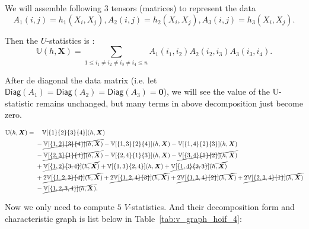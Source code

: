 \documentclass[letterpaper,11pt]{article}
\newcommand{\diag}{\mathsf{Diag}}
\newcommand{\diagp}[1]{\diag(#1)}
\newcommand{\ustat}{\mathbb{U}}
\newcommand{\vstat}{\mathbb{V}}
\begin{document}
We will assemble following 3 tensors (matrices) to represent the data
\begin{equation*}
    A_1(i,j) = h_1(X_i,X_j), A_2(i,j) = h_2(X_i,X_j), A_3(i,j) = h_3(X_i,X_j).
\end{equation*}

Then the $U$-statistics is :
\begin{equation*}
    \ustat(h, \bm{X}) = \sum_{1 \le i_1 \neq i_2 \neq i_3 \neq i_4 \leq n}  A_1(i_1,i_2)A_2(i_2,i_3)A_3(i_3,i_4).
\end{equation*}

After de diagonal the data matrix (i.e. let $\diagp{A_1} =  \diagp{A_2} = \diagp{A_3} = \bm{0}$), we will see the value of the U-statistic remains unchanged, but many terms in above decomposition just become zero. 

\begin{align*}
\ustat(h, \bm{X}) =\; & 
\hspace{1em}
\vstat[\{1\}\{2\}\{3\}\{4\}](h, \bm{X}) \\
& 
- \cancel{\vstat[\{1,2\}\{3\}\{4\}](h, \bm{X})}
- \vstat[\{1,3\}\{2\}\{4\}](h, \bm{X})
- \vstat[\{1,4\}\{2\}\{3\}](h, \bm{X}) \\
& 
- \cancel{\vstat[\{2,3\}\{1\}\{4\}](h, \bm{X})}
- \vstat[\{2,4\}\{1\}\{3\}](h, \bm{X})
- \cancel{\vstat[\{3,4\}\{1\}\{2\}](h, \bm{X})} \\
& 
+ \cancel{\vstat[\{1,2\}\{3,4\}](h, \bm{X})}
+ \vstat[\{1,3\}\{2,4\}](h, \bm{X})
+ \cancel{\vstat[\{1,4\}\{2,3\}](h, \bm{X})} \\
& 
+ \cancel{2\vstat[\{1,2,3\}\{4\}](h, \bm{X})}
+ \cancel{2\vstat[\{1,2,4\}\{3\}](h, \bm{X})}
+ \cancel{2\vstat[\{1,3,4\}\{2\}](h, \bm{X})}
+ \cancel{2\vstat[\{2,3,4\}\{1\}](h, \bm{X})} \\
& 
- \cancel{\vstat[\{1,2,3,4\}](h, \bm{X})}.
\end{align*}


Now we only need to compute $5$ $V$-statistics. And their decomposition form and characteristic graph is list below in Table~\ref{tab:v_graph_hoif_4}:
\end{document}
